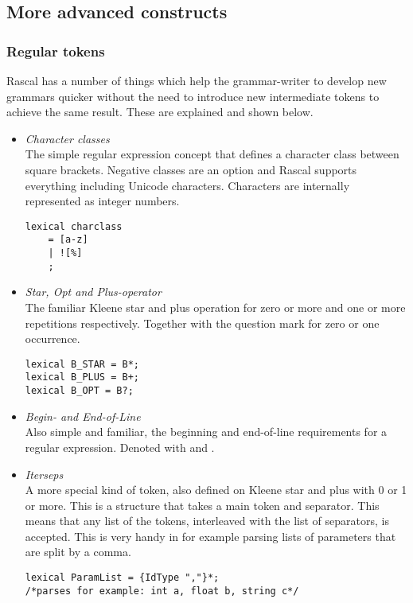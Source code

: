 \pagebreak
\subsection{More advanced constructs}
	\subsubsection{Regular tokens}
	Rascal has a number of things which help the grammar-writer to develop new grammars quicker without the need to introduce new intermediate tokens to achieve the same result. These are explained and shown below.
		\begin{itemize}
			\item \emph{Character classes}\\
			The simple regular expression concept that defines a character class between square brackets. Negative classes are an option and Rascal supports everything including Unicode characters. Characters are internally represented as integer numbers.
\begin{lstlisting}[language=RascalGrammar]
lexical charclass 
	= [a-z]
	| ![%]
	;
\end{lstlisting}
			\item \emph{Star, Opt and Plus-operator}\\
			The familiar Kleene star and plus operation for zero or more and one or more repetitions respectively. Together with the question mark for zero or one occurrence.
\begin{lstlisting}[language=RascalGrammar]
lexical B_STAR = B*;
lexical B_PLUS = B+;
lexical B_OPT = B?;
\end{lstlisting}
			\item \emph{Begin- and End-of-Line}\\
			Also simple and familiar, the beginning and end-of-line requirements for a regular expression. Denoted with \gram{^} and \gram{\$}.
			\item \emph{Iterseps}\\
			A more special kind of token, also defined on Kleene star and plus with 0 or 1 or more. This is a structure that takes a main token and separator. This means that any list of the  tokens, interleaved with the list of separators, is accepted. This is very handy in for example parsing lists of parameters that are split by a comma.
\begin{lstlisting}[language=RascalGrammar]
lexical ParamList = {IdType ","}*;
/*parses for example: int a, float b, string c*/
\end{lstlisting}
		\end{itemize}
